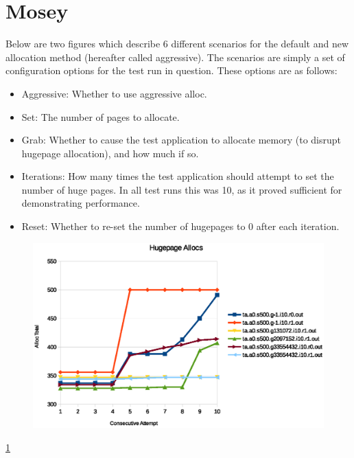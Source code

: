 \documentclass{article}
\begin{document}
\section{Mosey}
Below are two figures which describe 6 different scenarios for the default and new allocation method (hereafter called aggressive). The scenarios are simply a set of configuration options for the test run in question. These options are as follows: 
\begin{itemize}
	\item Aggressive: Whether to use aggressive alloc.
	\item Set: The number of pages to allocate.
	\item Grab: Whether to cause the test application to allocate memory (to disrupt hugepage allocation), and how much if so.
	\item  Iterations: How many times the test application should attempt to set the number of huge pages. In all test runs this was 10, as it proved sufficient for demonstrating performance.
	\item Reset: Whether to re-set the number of hugepages to 0 after each iteration.
\end{itemize}

\begin{figure}[h!]
	\includegraphics[width=\linewidth]{./datums/default_alloc.eps}
	\label{fig:default_alloc}
\end{figure}
\ref{fig:default_alloc}
\end{document}
